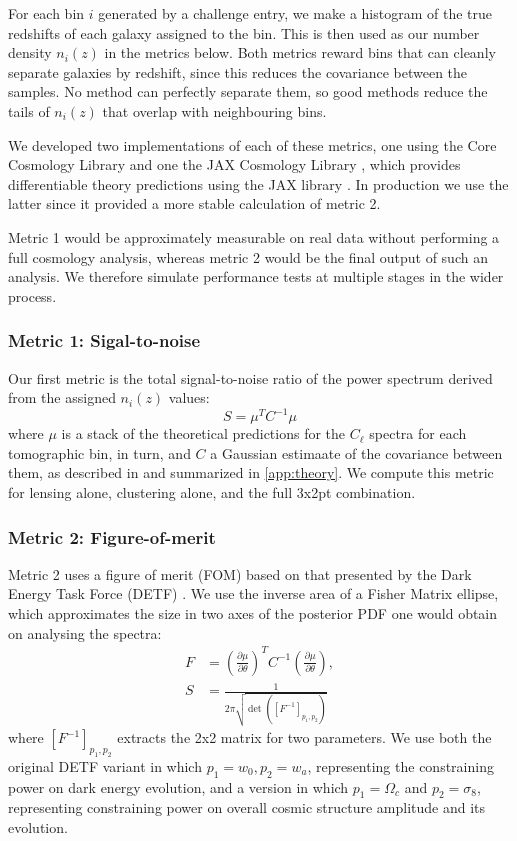 \documentclass[twocolumn,twocolappendix]{aastex63}
\begin{document}
For each bin $i$ generated by a challenge entry, we make a histogram of the true redshifts 
of each galaxy assigned to the bin.  This is then used as our number density $n_i(z)$ in the metrics 
below. Both metrics reward bins that can
cleanly separate galaxies by redshift, since this reduces the covariance between the samples. No
method can perfectly separate them, so good methods reduce the tails of $n_i(z)$ that overlap with 
neighbouring bins.

We developed two implementations of each of these metrics, one using the Core Cosmology Library 
\citep{ccl} and one the JAX Cosmology Library \citep{jax-cosmo}, which provides differentiable theory 
predictions using the JAX library \citep{jax}.  In production we use the latter since it provided a
more stable calculation of metric 2.

Metric 1 would be approximately measurable on real data without performing a full cosmology analysis,
whereas metric 2 would be the final output of such an analysis.  We therefore simulate performance
tests at multiple stages in the wider process.


\subsubsection{Metric 1: Sigal-to-noise}
Our first metric is the total signal-to-noise ratio of the power spectrum derived from the assigned
$n_i(z)$ values:
\begin{equation}
    S = \mu^{T} C^{-1} \mu
\label{eq:snr}
\end{equation}
where $\mu$ is a stack of the theoretical predictions for the $C_\ell$ spectra for each tomographic 
bin, in turn, and $C$ a Gaussian estimaate of the covariance between them, as described in
\citet{takada_jain} and summarized in \autoref{app:theory}.   We compute this metric for lensing alone, clustering alone, and the full 3x2pt combination.

\subsubsection{Metric 2: Figure-of-merit}

Metric 2 uses a figure of merit (FOM) based on that presented by the Dark Energy Task Force (DETF) \citep{detf}.  We 
use the inverse area of a Fisher Matrix ellipse, which approximates the size in two axes 
of the posterior PDF one would obtain on analysing the spectra:
\begin{align}
    F &= \left( \frac{\partial \mu}{\partial \theta} \right)^T C^{-1} \left( \frac{\partial \mu}{\partial \theta} \right), \\
    S &= \frac{1}{2 \pi \sqrt{\det{([F^{-1}]_{p_1, p_2})}}}
\label{eq:fom}
\end{align}
where $[F^{-1}]_{p_1, p_2}$ extracts the 2x2 matrix for two parameters.  We use both the original
DETF variant in which $p_1 = w_0, p_2 = w_a$, representing the constraining power on dark energy 
evolution, and a version in which $p_1 = \Omega_c$ and $p_2 = \sigma_8$, representing constraining
power on overall cosmic structure amplitude and its evolution.
\end{document}
